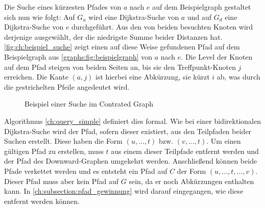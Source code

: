 Die Suche eines kürzesten Pfades von $a$ nach $e$ auf dem Beispielgraph gestaltet sich nun wie folgt:
Auf $G_u$ wird eine Dijkstra-Suche von $a$ und auf $G_d$ eine Dijkstra-Suche von $e$ durchgeführt.
Aus den von beiden besuchten Knoten wird derjenige ausgewählt, der die niedrigste Summe beider Distanzen hat.
\autoref{fig:ch:beispiel_suche} zeigt einen auf diese Weise gefundenen Pfad auf dem Beispielgraph aus \autoref{graphs:fig:beispielgraph} von $a$ nach $e$.
Die Level der Knoten auf dem Pfad steigen von beiden Seiten an, bis sie den Treffpunkt-Knoten $j$ erreichen.
Die Kante $(a, j)$ ist hierbei eine Abkürzung, sie kürzt $i$ ab, was durch die gestrichelten Pfeile angedeutet wird.

\begin{figure}[ht]
    \centering
    \caption{Beispiel einer Suche im Contrated Graph}
    \label{fig:ch:beispiel_suche}
\end{figure}

Algorithmus \ref{ch:query_simple} definiert dies formal.
Wie bei einer bidirektionalen Dijkstra-Suche wird der Pfad, sofern dieser existiert, aus den Teilpfaden beider Suchen erstellt.
Diese haben die Form $(u, \dotsc, t)$ bzw. $(v, \dotsc, t)$.
Um einen gültigen Pfad zu erstellen, muss $t$ aus einem dieser Teilpfade entfernt werden und der Pfad des Downward-Graphen umgekehrt werden.
Anschließend können beide Pfade verkettet werden und es entsteht ein Pfad auf $C$ der Form $(u, \dotsc, t, \dotsc, v)$.
Dieser Pfad muss aber kein Pfad auf $G$ sein, da er noch Abkürzungen enthalten kann.
In \autoref{ch:subsection:pfad_gewinnung} wird darauf eingegangen, wie diese entfernt werden können.

